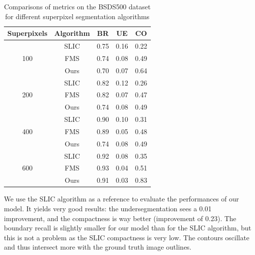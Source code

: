 \documentclass{article}
\begin{document}
        \begin{table}[!ht]
            \centering
            \begin{tabular}{|c|c|ccc|}
                \hline
                Superpixels & Algorithm & BR & UE & CO\\
                \hline
                \hline
                \multirow{3}{*}{100} & SLIC & 0.75 & 0.16 & 0.22 \\
                                     & FMS & 0.74 & 0.08 & 0.49 \\
                                     & Ours & 0.70 & 0.07 & 0.64\\
                \hline
                \multirow{3}{*}{200} & SLIC & 0.82 & 0.12 & 0.26\\
                                     & FMS & 0.82 & 0.07 & 0.47 \\
                                     & Ours & 0.74 & 0.08 & 0.49 \\
                \hline
                \multirow{3}{*}{400} & SLIC & 0.90 & 0.10 & 0.31\\
                                     & FMS & 0.89 & 0.05 & 0.48 \\
                                     & Ours & 0.74 & 0.08 & 0.49 \\
                \hline
                \multirow{3}{*}{600} & SLIC & 0.92 & 0.08 & 0.35 \\
                                     & FMS & 0.93 & 0.04 & 0.51 \\
                                     & Ours & 0.91 & 0.03 & 0.83\\
                \hline
            \end{tabular}
            \caption{Comparisons of metrics on the BSDS500 dataset for different superpixel segmentation algorithms}
        \end{table}
        \par
        We use the SLIC algorithm as a reference to evaluate the performances of our model. It yields very good results: the undersegmentation sees a 0.01 improvement, and the compactness is way better (improvement of 0.23). The boundary recall is slightly smaller for our model than for the SLIC algorithm, but this is not a problem as the SLIC compactness is very low. The contours oscillate and thus intersect more with the ground truth image outlines.
\end{document}
